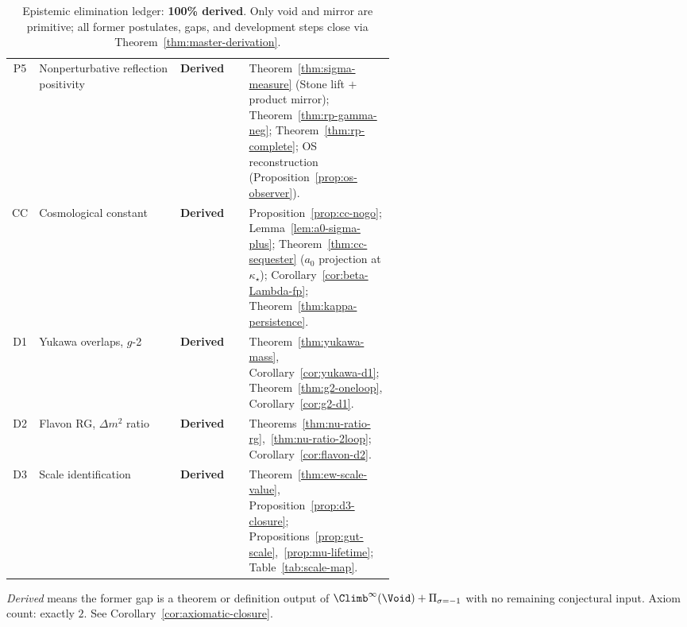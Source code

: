 \begin{table}[ht]
\begin{tabular}{@{}clp{0.18\linewidth}p{0.38\linewidth}@{}}
\addlinespace
P5 &
  Nonperturbative reflection positivity &
  \textbf{Derived} &
  Theorem~\ref{thm:sigma-measure} (Stone lift $+$ product mirror);
  Theorem~\ref{thm:rp-gamma-neg}; Theorem~\ref{thm:rp-complete};
  OS reconstruction (Proposition~\ref{prop:os-observer}). \\
\addlinespace
CC &
  Cosmological constant &
  \textbf{Derived} &
  Proposition~\ref{prop:cc-nogo}; Lemma~\ref{lem:a0-sigma-plus};
  Theorem~\ref{thm:cc-sequester} ($a_0$ projection at $\kappa_\star$);
  Corollary~\ref{cor:beta-Lambda-fp};
  Theorem~\ref{thm:kappa-persistence}. \\
\addlinespace
D1 &
  Yukawa overlaps, $g$-2 &
  \textbf{Derived} &
  Theorem~\ref{thm:yukawa-mass}, Corollary~\ref{cor:yukawa-d1};
  Theorem~\ref{thm:g2-oneloop}, Corollary~\ref{cor:g2-d1}. \\
\addlinespace
D2 &
  Flavon RG, $\Delta m^2$ ratio &
  \textbf{Derived} &
  Theorems~\ref{thm:nu-ratio-rg},~\ref{thm:nu-ratio-2loop};
  Corollary~\ref{cor:flavon-d2}. \\
\addlinespace
D3 &
  Scale identification &
  \textbf{Derived} &
  Theorem~\ref{thm:ew-scale-value}, Proposition~\ref{prop:d3-closure};
  Propositions~\ref{prop:gut-scale},~\ref{prop:mu-lifetime};
  Table~\ref{tab:scale-map}. \\
\bottomrule
\end{tabular}
\caption{Epistemic elimination ledger: \textbf{100\% derived}. Only void and
mirror are primitive; all former postulates, gaps, and development steps close
via Theorem~\ref{thm:master-derivation}.}
\label{tab:gap-ledger}
\end{table}

\begin{remark}
\emph{Derived} means the former gap is a theorem or definition output of
$\Climb^\infty(\Void)+\Pi_{\sigma=-1}$ with no remaining conjectural input.
Axiom count: exactly $2$. See Corollary~\ref{cor:axiomatic-closure}.
\end{remark}